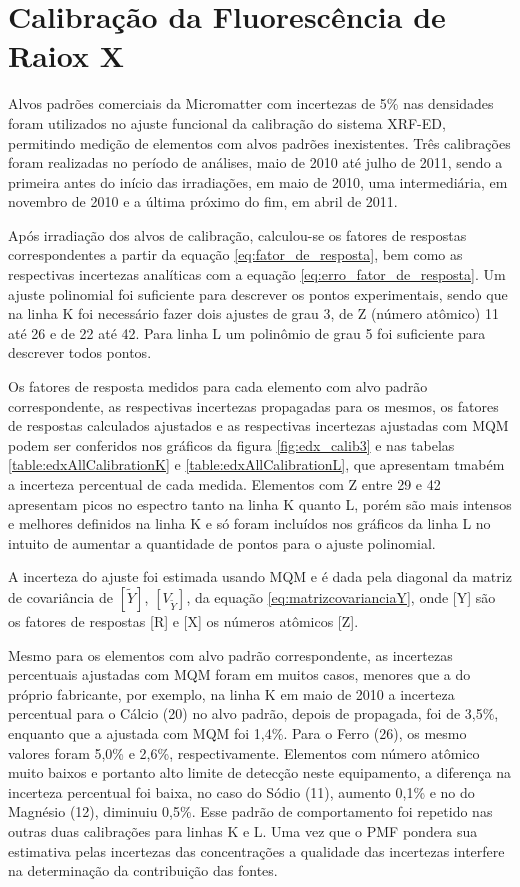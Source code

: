 \section{Calibração da Fluorescência de Raiox X}

Alvos padrões comerciais da Micromatter com incertezas de 5\% nas densidades 
foram utilizados no ajuste funcional da calibração do sistema XRF-ED, 
permitindo medição de elementos com alvos padrões inexistentes. Três
calibrações foram realizadas no período de análises, maio de 2010 até julho de 
2011, sendo a primeira antes do início das irradiações, em maio de 2010, 
uma intermediária, em novembro de 2010 e a última próximo do fim, em abril de 
2011.

Após irradiação dos alvos de calibração, calculou-se os fatores de respostas 
correspondentes a partir da equação \ref{eq:fator_de_resposta}, bem como as 
respectivas incertezas analíticas com a equação \ref{eq:erro_fator_de_resposta}.
Um ajuste polinomial foi suficiente para descrever os pontos experimentais,
sendo que na linha K foi necessário fazer dois ajustes de grau 3, de Z 
(número atômico) 11 até 26 e de 22 até 42. Para linha L um polinômio de grau 
5 foi suficiente para descrever todos pontos.

Os fatores de resposta medidos para cada elemento com alvo padrão 
correspondente, as respectivas incertezas propagadas para os mesmos, 
os fatores de respostas calculados ajustados e as respectivas incertezas 
ajustadas com MQM podem ser conferidos nos 
gráficos da figura \ref{fig:edx_calib3} e nas tabelas 
\ref{table:edxAllCalibrationK} e \ref{table:edxAllCalibrationL}, que 
apresentam tmabém a incerteza percentual de cada medida. 
Elementos com Z entre 29 e 42 apresentam picos no espectro tanto na linha K 
quanto L, porém são mais intensos e melhores
definidos na linha K e só foram incluídos nos gráficos da linha L no intuito de 
aumentar a quantidade de pontos para o ajuste polinomial.

A incerteza do ajuste foi estimada usando MQM e é dada pela diagonal da matriz 
de covariância de $[\tilde{Y}]$, $[V_{\tilde{Y}}]$, da equação 
\ref{eq:matrizcovarianciaY}, onde [Y] são os fatores de respostas [R] e 
[X] os números atômicos [Z]. 

Mesmo para os elementos com alvo padrão correspondente, as incertezas 
percentuais ajustadas com MQM foram em muitos casos, menores que a 
do próprio fabricante, por exemplo, na linha K em maio de 2010 a 
incerteza percentual para o Cálcio (20) no alvo padrão, depois de propagada,
foi de 3,5\%, enquanto que a ajustada com MQM foi 1,4\%. Para o Ferro (26), os
mesmo valores foram 5,0\% e 2,6\%, respectivamente. Elementos com número atômico
muito baixos e portanto alto limite de detecção neste equipamento, a diferença 
na incerteza percentual foi baixa, no caso do Sódio (11), aumento 0,1\% e no 
do Magnésio (12), diminuiu 0,5\%. Esse padrão de comportamento foi repetido nas
outras duas calibrações para linhas K e L. Uma vez que o PMF pondera sua 
estimativa pelas incertezas das concentrações a
qualidade das incertezas interfere na determinação da contribuição das fontes.

